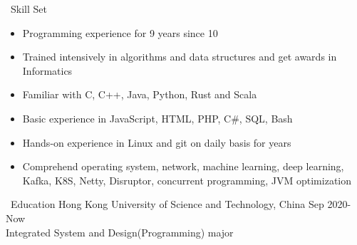 \documentclass{resume}
\begin{document}

\begin{rSection}{\faCogs~Skill Set}
    \begin{itemize}
        \itemsep -0.5em
        \item Programming experience for 9 years since 10
        \item Trained intensively in algorithms and data structures and get awards in Informatics
        \item Familiar with C, C++, Java, Python, Rust and Scala
        \item Basic experience in JavaScript, HTML, PHP, C\#, SQL, Bash
        \item Hands-on experience in Linux and git on daily basis for years
        \item Comprehend operating system, network, machine learning, deep learning, Kafka, K8S, Netty, Disruptor, concurrent programming, JVM optimization
    \end{itemize}
    
\end{rSection}

\begin{rSection}{\faGraduationCap~Education}
    Hong Kong University of Science and Technology, China \hfill Sep 2020-Now \\ Integrated System and Design(Programming) major
\end{rSection}
\end{document}
